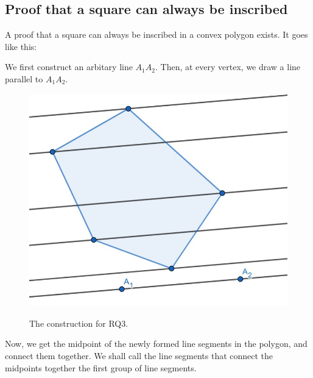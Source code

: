 \documentclass[12pt]{scrartcl}
\begin{document}
\subsection{Proof that a square can always be inscribed}
A proof that a square can always be inscribed in a convex polygon exists. It goes like this:

We first construct an arbitary line $A_{1}A_{2}$. Then, at every vertex, we draw a line parallel to $A_{1}A_{2}$.

\begin{figure}[htpb]
	\centering
	\includegraphics[scale=.75]{images/rq3_1_1.jpg}
	\label{fig:rq3_1_1_img}
	\caption{The construction for RQ3.}
\end{figure}

Now, we get the midpoint of the newly formed line segments in the polygon, and connect them together. We shall call the line segments that connect the midpoints together the first group of line segments.
\end{document}
